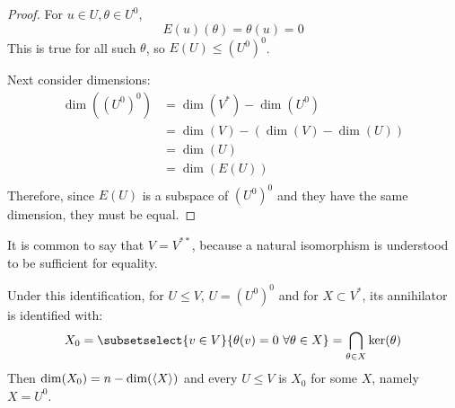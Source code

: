 \documentclass[../Main.tex]{subfiles}
\begin{document}
\begin{proof}
    For $u \in U, \theta \in U^0$,
    \begin{equation*}
        E(u)(\theta) = \theta(u) = 0
    \end{equation*}
    This is true for all such $\theta$, so $E(U) \leq (U^0)^0$.

    Next consider dimensions:
    \begin{align*}
        \dim((U^0)^0) &= \dim(V^*) - \dim(U^0) \\
        &= \dim(V) - \left(\dim(V) - \dim(U)\right) \\
        &= \dim(U) \\
        &= \dim(E(U)) \\
    \end{align*}
    Therefore, since $E(U)$ is a subspace of $(U^0)^0$ and they have the same dimension, they must be equal.
\end{proof}
\begin{remarks}
    \item It is common to say that $V = V^{**}$, because a natural isomorphism is understood to be sufficient for equality.
    \item Under this identification, for $U \leq V$, $U = (U^0)^0$ and for $X \subset V^*$, its annihilator is identified with:
        \begin{equation*}
            X_0 = \subsetselect{v \in V}{\theta(v) = 0~\forall \theta \in X} = \bigcap_{\theta \in X}\ker(\theta)
        \end{equation*}
        Then $\dim(X_0) = n - \dim(\left\langle X \right\rangle)$ and every $U \leq V$ is $X_0$ for some $X$, namely $X = U^0$.
\end{remarks}
\end{document}
